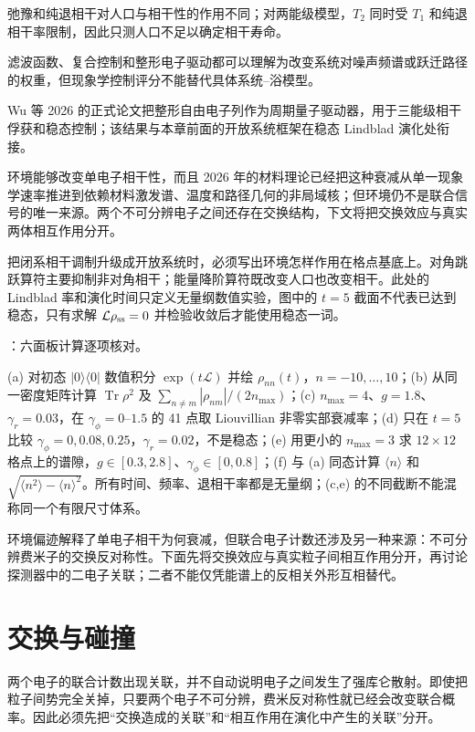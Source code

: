 弛豫和纯退相干对人口与相干性的作用不同；对两能级模型，$T_2$ 同时受 $T_1$ 和纯退相干率限制，因此只测人口不足以确定相干寿命。

滤波函数、复合控制和整形电子驱动都可以理解为改变系统对噪声频谱或跃迁路径的权重，但现象学控制评分不能替代具体系统--浴模型。

Wu 等 2026 的正式论文把整形自由电子列作为周期量子驱动器，用于三能级相干俘获和稳态控制；该结果与本章前面的开放系统框架在稳态 Lindblad 演化处衔接。

环境能够改变单电子相干性，而且 2026 年的材料理论已经把这种衰减从单一现象学速率推进到依赖材料激发谱、温度和路径几何的非局域核；但环境仍不是联合信号的唯一来源。两个不可分辨电子之间还存在交换结构，下文将把交换效应与真实两体相互作用分开。

\clearpage
\par\medskip 把闭系相干调制升级成开放系统时，必须写出环境怎样作用在格点基底上。对角跳跃算符主要抑制非对角相干；能量降阶算符既改变人口也改变相干。此处的 Lindblad 率和演化时间只定义无量纲数值实验，图中的 $t=5$ 截面不代表已达到稳态，只有求解 $\mathcal L\rho_{\rm ss}=0$ 并检验收敛后才能使用稳态一词。


\noindent {}：六面板计算逐项核对。\par\noindent (a) 对初态 $|0\rangle\langle0|$ 数值积分 $\exp(t\mathcal L)$ 并绘 $\rho_{nn}(t)$，$n=-10,\ldots,10$；(b) 从同一密度矩阵计算 $\operatorname{Tr}\rho^2$ 及 $\sum_{n\ne m}|\rho_{nm}|/(2n_{\max})$；(c) $n_{\max}=4$、$g=1.8$、$\gamma_r=0.03$，在 $\gamma_\phi=0$--$1.5$ 的 41 点取 Liouvillian 非零实部衰减率；(d) 只在 $t=5$ 比较 $\gamma_\phi=0,0.08,0.25$，$\gamma_r=0.02$，不是稳态；(e) 用更小的 $n_{\max}=3$ 求 $12\times12$ 格点上的谱隙，$g\in[0.3,2.8]$、$\gamma_\phi\in[0,0.8]$；(f) 与 (a) 同态计算 $\langle n\rangle$ 和 $\sqrt{\langle n^2\rangle-\langle n\rangle^2}$。所有时间、频率、退相干率都是无量纲；(c,e) 的不同截断不能混称同一个有限尺寸体系。


\par\medskip
环境偏迹解释了单电子相干为何衰减，但联合电子计数还涉及另一种来源：不可分辨费米子的交换反对称性。下面先将交换效应与真实粒子间相互作用分开，再讨论探测器中的二电子关联；二者不能仅凭能谱上的反相关外形互相替代。
\par\medskip


\section{交换与碰撞}
两个电子的联合计数出现关联，并不自动说明电子之间发生了强库仑散射。即使把粒子间势完全关掉，只要两个电子不可分辨，费米反对称性就已经会改变联合概率。因此必须先把“交换造成的关联”和“相互作用在演化中产生的关联”分开。

